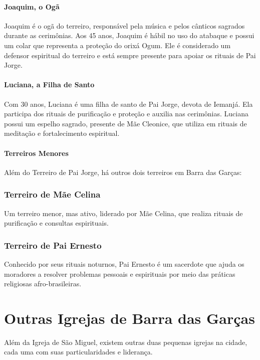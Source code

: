 \paragraph{Joaquim, o Ogã}  
Joaquim é o ogã do terreiro, responsável pela música e pelos cânticos sagrados durante as cerimônias. Aos 45 anos, Joaquim é hábil no uso do atabaque e possui um colar que representa a proteção do orixá Ogum. Ele é considerado um defensor espiritual do terreiro e está sempre presente para apoiar os rituais de Pai Jorge.

\paragraph{Luciana, a Filha de Santo}  
Com 30 anos, Luciana é uma filha de santo de Pai Jorge, devota de Iemanjá. Ela participa dos rituais de purificação e proteção e auxilia nas cerimônias. Luciana possui um espelho sagrado, presente de Mãe Cleonice, que utiliza em rituais de meditação e fortalecimento espiritual.

\paragraph{Terreiros Menores}

Além do Terreiro de Pai Jorge, há outros dois terreiros em Barra das Garças:

\subsubsection{Terreiro de Mãe Celina}  
Um terreiro menor, mas ativo, liderado por Mãe Celina, que realiza rituais de purificação e consultas espirituais.

\subsubsection{Terreiro de Pai Ernesto}  
Conhecido por seus rituais noturnos, Pai Ernesto é um sacerdote que ajuda os moradores a resolver problemas pessoais e espirituais por meio das práticas religiosas afro-brasileiras.

\section{Outras Igrejas de Barra das Garças}

Além da Igreja de São Miguel, existem outras duas pequenas igrejas na cidade, cada uma com suas particularidades e liderança.

